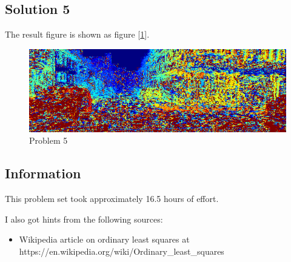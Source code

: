 \documentclass{article}
\newcommand{\info}{\clearpage \subsection*{Information}}
\newcommand{\solution}[1]{\clearpage \subsection*{Solution #1}}
\begin{document}
\solution{5}
The result figure is shown as figure [\ref{fig:5}].
\begin{figure}[htbp]
  \centering
  \includegraphics[width = \textwidth]{./code/outputs/prob5.png}
  \caption{Problem 5}
  \label{fig:5}
\end{figure}
\info

This problem set took approximately 16.5 hours of effort.

I also got hints from the following sources:
\begin{itemize}
\item Wikipedia article on ordinary least squares at https://en.wikipedia.org/wiki/Ordinary\_least\_squares
\end{itemize}
\end{document}

